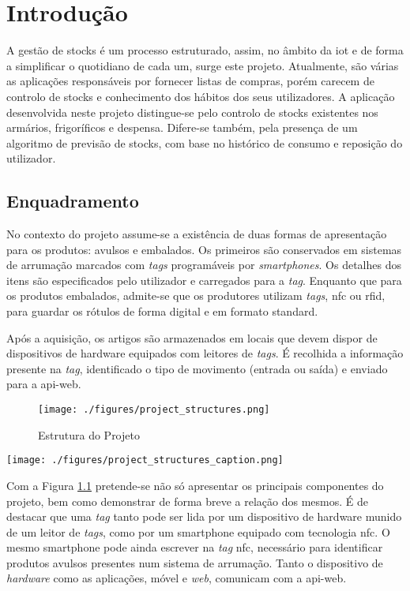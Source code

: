 %
%
\chapter{Introdução} \label{cap1}

A gestão de stocks é um processo estruturado, assim, no âmbito da \acrfull{iot} e de forma a simplificar o quotidiano de cada um, surge este projeto. Atualmente, são várias as aplicações responsáveis por fornecer listas de compras, porém carecem de controlo de stocks e conhecimento dos hábitos dos seus utilizadores. A aplicação desenvolvida neste projeto distingue-se pelo controlo de stocks existentes nos armários, frigoríficos e despensa. Difere-se também, pela presença de um algoritmo de previsão de stocks, com base no histórico de consumo e reposição do utilizador.

%
%
\section{Enquadramento} \label{sec11}

No contexto do projeto assume-se a existência de duas formas de apresentação para os produtos: avulsos e embalados. Os primeiros são conservados em sistemas de arrumação marcados com \textit{tags} programáveis por \textit{smartphones}. Os detalhes dos itens são especificados pelo utilizador e carregados para a \textit{tag}. Enquanto que para os produtos embalados, admite-se que os produtores utilizam \textit{tags}, \acrfull{nfc} ou \acrfull{rfid}, para guardar os rótulos de forma digital e em formato standard.

Após a aquisição, os artigos são armazenados em locais que devem dispor de dispositivos de hardware equipados com leitores de \textit{tags}. É recolhida a informação presente na \textit{tag}, identificado o tipo de movimento (entrada ou saída) e enviado para a \gls{api-web}. 

\begin{figure}[H]
	\centering
	\texttt{[image: ./figures/project\_structures.png]}
	\caption{Estrutura do Projeto}
	\label{project-structure}
\end{figure}

\begin{center}
	\texttt{[image: ./figures/project\_structures\_caption.png]}
\end{center}

Com a Figura \ref{project-structure} pretende-se não só apresentar os principais componentes do projeto, bem como demonstrar de forma breve a relação dos mesmos. É de destacar que uma \textit{tag} tanto pode ser lida por um dispositivo de hardware munido de um leitor de \textit{tags}, como por um smartphone equipado com tecnologia \acrshort{nfc}. O mesmo smartphone pode ainda escrever na \textit{tag} \acrshort{nfc}, necessário para identificar produtos avulsos presentes num sistema de arrumação. Tanto o dispositivo de \textit{hardware} como as aplicações, móvel e \textit{web}, comunicam com a \gls{api-web}.

